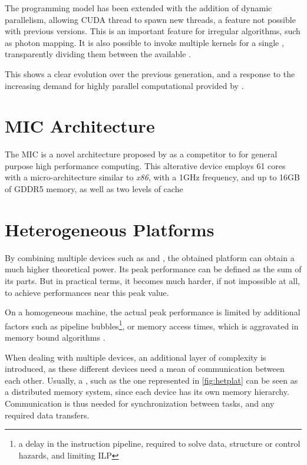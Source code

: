 \documentclass[main.tex]{subfiles}
\begin{document}

The programming model has been extended with the addition of dynamic parallelism, allowing \acs{CUDA} thread to spawn new threads, a feature not possible with previous versions. This is an important feature for irregular algorithms, such as photon mapping. It is also possible to invoke multiple kernels for a single \gpu, transparently dividing them between the available \smxs.

This shows a clear evolution over the previous generation, and a response to the increasing demand for highly parallel computational provided by \gpus.


\section{MIC Architecture}

The \ac{MIC}  is a novel architecture proposed by \intel as a competitor to \gpus for general purpose high performance computing. This alterative device employs 61 cores with a micro-architecture similar to \textit{x86}, with a 1GHz frequency, and up to 16GB of GDDR5 memory, as well as two levels of cache


\section{Heterogeneous Platforms}

By combining multiple devices such as \cpus and \gpus, the obtained platform can obtain a much higher theoretical power. Its peak performance can be defined as the sum of its parts. But in practical terms, it becomes much harder, if not impossible at all, to achieve performances near this peak value.

On a homogeneous machine, the actual peak performance is limited by additional factors such as pipeline bubbles\footnote{a delay in the instruction pipeline, required to solve data, structure or control hazards, and limiting \ac{ILP} }, or memory access times, which is aggravated in memory bound algorithms \cite{williams2009roofline}.

When dealing with multiple devices, an additional layer of complexity is introduced, as these different devices need a mean of communication between each other. Usually, a \hetplat, such as the one represented in \cref{fig:hetplat} can be seen as a distributed memory system, since each device has its own memory hierarchy. Communication is thus needed for synchronization between tasks, and any required data transfers.
\end{document}
